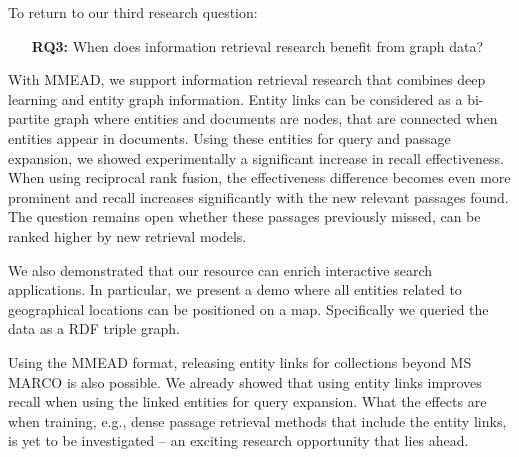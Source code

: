 To return to our third research question:
\begin{itemize}
	\item[\textbf{RQ3:}] When does information retrieval research benefit from graph data?
\end{itemize}   

With MMEAD, we support information retrieval research that combines deep learning and entity graph information. Entity links can be considered as a bi-partite graph where entities and documents are nodes, that are connected when entities appear in documents. Using these entities for query and passage expansion, we showed experimentally a significant increase in recall effectiveness. When using reciprocal rank fusion, the effectiveness difference becomes even more prominent and recall increases significantly with the new relevant passages found. The question remains open whether these passages previously missed, can be ranked higher by new retrieval models.

We also demonstrated that our resource can enrich interactive search applications. In particular, we present a demo where all entities related to geographical locations can be positioned on a map. Specifically we queried the data as a RDF triple graph.

Using the MMEAD format, releasing entity links for collections beyond MS MARCO is also possible. We already showed that using entity links improves recall when using the linked entities for query expansion. What the effects are when training, e.g., dense passage retrieval methods that include the entity links, is yet to be investigated -- an exciting research opportunity that lies ahead. 
